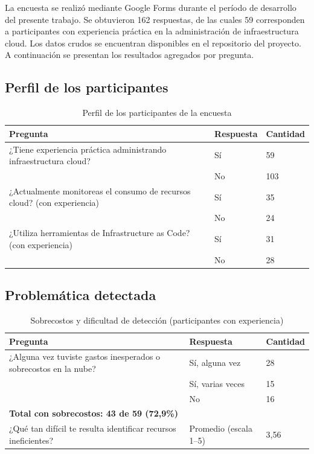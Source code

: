 
La encuesta se realizó mediante Google Forms durante el período de desarrollo del presente trabajo. Se obtuvieron 162 respuestas, de las cuales 59 corresponden a participantes con experiencia práctica en la administración de infraestructura cloud. Los datos crudos se encuentran disponibles en el repositorio del proyecto. A continuación se presentan los resultados agregados por pregunta.

\subsection{Perfil de los participantes}

\begin{table}[H]
\centering
\scriptsize
\label{tab:enc-perfil}
\begin{tabular}{|p{8cm}|p{2cm}|p{2.5cm}|}
\hline
\textbf{Pregunta} & \textbf{Respuesta} & \textbf{Cantidad} \\
\hline
¿Tiene experiencia práctica administrando infraestructura cloud? & Sí & 59 \\
& No & 103 \\
\hline
¿Actualmente monitoreas el consumo de recursos cloud? (con experiencia) & Sí & 35 \\
& No & 24 \\
\hline
¿Utiliza herramientas de Infrastructure as Code? (con experiencia) & Sí & 31 \\
& No & 28 \\
\hline
\end{tabular}
\caption{Perfil de los participantes de la encuesta}
\end{table}

\subsection{Problemática detectada}

\begin{table}[H]
\centering
\scriptsize
\label{tab:enc-problematica}
\begin{tabular}{|p{8cm}|p{2.5cm}|p{2cm}|}
\hline
\textbf{Pregunta} & \textbf{Respuesta} & \textbf{Cantidad} \\
\hline
¿Alguna vez tuviste gastos inesperados o sobrecostos en la nube? & Sí, alguna vez & 28 \\
& Sí, varias veces & 15 \\
& No & 16 \\
\hline
\multicolumn{3}{|l|}{\textbf{Total con sobrecostos: 43 de 59 (72,9\%)}} \\
\hline
¿Qué tan difícil te resulta identificar recursos ineficientes? & Promedio (escala 1--5) & 3,56 \\
\hline
\end{tabular}
\caption{Sobrecostos y dificultad de detección (participantes con experiencia)}
\end{table}

